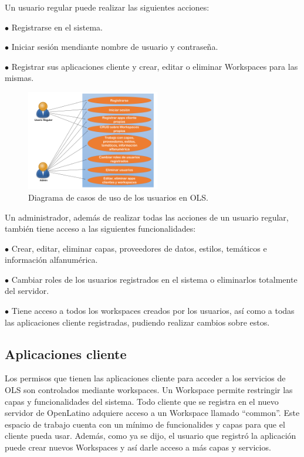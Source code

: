 Un usuario regular puede realizar las siguientes acciones:

$\bullet$ Registrarse en el sistema.

$\bullet$ Iniciar sesi\'on mendiante nombre de usuario y contrase\~na.

$\bullet$ Registrar sus aplicaciones cliente y crear, editar o eliminar Workspaces para las mismas.



\begin{figure} 
\vspace{-20pt} 
\begin{center} 
\includegraphics[width=0.52\textwidth]{images/casosdeUsousuario.png} 
\end{center} \vspace{-20pt} \caption{Diagrama de casos de uso de los usuarios en OLS.} \label{casos1}\vspace{-10pt} 
\end{figure}

Un administrador, adem\'as de realizar todas las acciones de un usuario regular, tambi\'en tiene acceso a las siguientes funcionalidades:

$\bullet$ Crear, editar, eliminar capas, proveedores de datos, estilos, tem\'aticos e informaci\'on alfanum\'erica.

$\bullet$ Cambiar roles de los usuarios registrados en el sistema o eliminarlos totalmente del servidor.

$\bullet$ Tiene acceso a todos los workspaces creados por los usuarios, as\'i como a todas las aplicaciones cliente registradas, pudiendo realizar cambios sobre estos.


\subsection{Aplicaciones cliente}
Los permisos que tienen las aplicaciones cliente para acceder a los servicios de OLS son controlados mediante workspaces. Un Workspace permite restringir las capas y funcionalidades del sistema. Todo cliente que se registra en el nuevo servidor de OpenLatino adquiere acceso a un Workspace llamado “common”. Este espacio de trabajo cuenta con un m\'inimo de funcionalides y capas para que el cliente pueda usar. Adem\'as, como ya se dijo, el usuario que registr\'o la aplicaci\'on puede crear nuevos Workspaces y as\'i darle acceso a m\'as capas y servicios.

